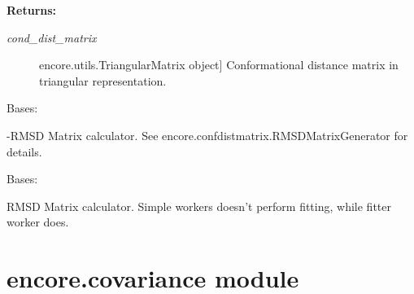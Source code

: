 \documentclass[letterpaper,10pt,english]{sphinxmanual}
\begin{document}
\begin{fulllineitems}
\begin{fulllineitems}
\begin{description}
\end{description}

\textbf{Returns:}
\begin{description}
\item[{\emph{cond\_dist\_matrix}}] \leavevmode{[}encore.utils.TriangularMatrix object{]}
Conformational distance matrix in triangular representation.

\end{description}

\end{fulllineitems}


\end{fulllineitems}


\begin{fulllineitems}
\label{index:encore.confdistmatrix.MinusRMSDMatrixGenerator}
Bases: {\hyperref[index:encore.confdistmatrix.ConformationalDistanceMatrixGenerator]{\emph{}}}

-RMSD Matrix calculator. See encore.confdistmatrix.RMSDMatrixGenerator for details.

\end{fulllineitems}


\begin{fulllineitems}
\label{index:encore.confdistmatrix.RMSDMatrixGenerator}
Bases: {\hyperref[index:encore.confdistmatrix.ConformationalDistanceMatrixGenerator]{\emph{}}}

RMSD Matrix calculator. Simple workers doesn't perform fitting, while fitter worker does.

\end{fulllineitems}



\section{encore.covariance module}
\label{index:module-encore.covariance}\label{index:encore-covariance-module}
\end{document}
